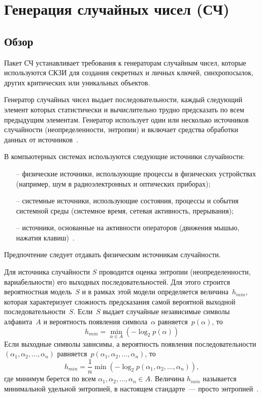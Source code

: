 \section{Генерация случайных чисел (СЧ)}\label{RN}

\subsection{Обзор}\label{RN.Intro}

Пакет СЧ устанавливает требования к генераторам случайным чисел, которые
используются СКЗИ для создания секретных и личных ключей, синхропосылок, других
критических или уникальных объектов.

Генератор случайных чисел выдает последовательности, каждый следующий элемент
которых статистически и вычислительно трудно предсказать по всем предыдущим
элементам.
%
Генератор использует один или несколько источников случайности
(неопределенности, энтропии) и включает средства обработки данных от 
источников~.

В компьютерных системах используются следующие источники случайности: 
\begin{itemize}
\item[--]
физические источники, использующие процессы в физических устройствах (например,
шум в радиоэлектронных и оптических приборах);

\item[--]
системные источники, использующие состояния, процессы и события системной среды
(системное время, сетевая активность, прерывания);

\item[--]
источники, основанные на активности операторов (движения мышью, нажатия 
клавиш)~.
\end{itemize}

Предпочтение следует отдавать физическим источникам случайности.

Для источника случайности $S$ проводится оценка энтропии (неопределенности,
вариабельности) его выходных последовательностей. Для этого строится
вероятностная модель~$S$ и в рамках этой модели определяется величина~$h_{min}$,
которая характеризует сложность предсказания самой вероятной выходной 
последовательности~$S$.  
%
Если~$S$ выдает случайные независимые символы алфавита~$A$ и
вероятность появления символа~$\alpha$ равняется~$p(\alpha)$, то
$$
h_{min}=\min_{\alpha\in A}(-\log_2 p(\alpha))
$$
Если выходные символы зависимы, а вероятность появления 
последовательности $(\alpha_1,\alpha_2,\ldots,\alpha_n)$ 
равняется~$p(\alpha_1,\alpha_2,\ldots,\alpha_n)$, 
то
$$
h_{min}=\frac{1}{n}\min(-\log_2 p(\alpha_1,\alpha_2,\ldots,\alpha_n)),
$$
где минимум берется по всем $\alpha_1,\alpha_2,\ldots,\alpha_n\in A$.
%
Величина $h_{min}$ называется минимальной удельной энтропией,
в настоящем стандарте~--- просто энтропией~.

